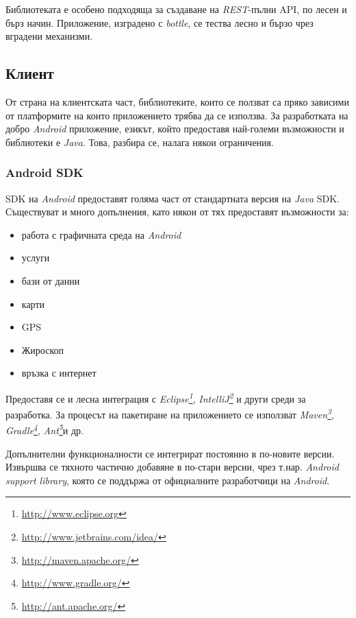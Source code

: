 		Библиотеката е особено подходяща за създаване на \emph{REST}-пълни \ac{API}, по лесен и бърз начин. Приложение, изградено с \emph{bottle}, се тества лесно и бързо чрез вградени механизми.
		
	\subsection{Клиент}
		
		От страна на клиентската част, библиотеките, които се ползват са пряко зависими от платформите на които приложението трябва да се използва.	
		За разработката на добро \emph{Android} приложение, езикът, който предоставя най-големи възможности и библиотеки е \emph{Java}. Това, разбира се, налага някои ограничения.
		
		\subsubsection{Android SDK}

		\ac{SDK} на \emph{Android} предоставят голяма част от стандартната версия на \emph{Java} \ac{SDK}. Съществуват и много допълнения, като някои от тях предоставят възможности за:
		
		\begin{itemize}
			\item работа с графичната среда на \emph{Android}
			\item услуги
			\item бази от данни
			\item карти
			\item GPS
			\item Жироскоп
			\item връзка с интернет
		\end{itemize}
		
		Предоставя се и лесна интеграция с \emph{Eclipse\footnote{\url{http://www.eclipse.org}}}, \emph{IntelliJ\footnote{\url{http://www.jetbrains.com/idea/}}} и други среди за разработка. За процесът на пакетиране на приложението се използват \emph{Maven\footnote{\url{http://maven.apache.org/}}}, \emph{Gradle\footnote{\url{http://www.gradle.org/}}}, \emph{Ant\footnote{\url{http://ant.apache.org/}}}и др.
		
		Допълнителни функционалности се интегрират постоянно в по-новите версии. Извършва се тяхното частично добавяне в по-стари версии, чрез т.нар. \emph{Android support library}, която се поддържа от официалните разработчици на \emph{Android}.
		
